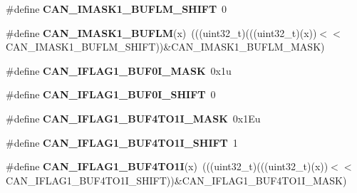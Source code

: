 \begin{DoxyCompactItemize}
\item 
\#define {\bfseries C\+A\+N\+\_\+\+I\+M\+A\+S\+K1\+\_\+\+B\+U\+F\+L\+M\+\_\+\+S\+H\+I\+FT}~0\hypertarget{group__CAN__Register__Masks_gac50c90f8a89aa464399090953c634b8a}{}\label{group__CAN__Register__Masks_gac50c90f8a89aa464399090953c634b8a}

\item 
\#define {\bfseries C\+A\+N\+\_\+\+I\+M\+A\+S\+K1\+\_\+\+B\+U\+F\+LM}(x)~(((uint32\+\_\+t)(((uint32\+\_\+t)(x))$<$$<$C\+A\+N\+\_\+\+I\+M\+A\+S\+K1\+\_\+\+B\+U\+F\+L\+M\+\_\+\+S\+H\+I\+FT))\&C\+A\+N\+\_\+\+I\+M\+A\+S\+K1\+\_\+\+B\+U\+F\+L\+M\+\_\+\+M\+A\+SK)\hypertarget{group__CAN__Register__Masks_gad88c742e823f935e71682894123617b6}{}\label{group__CAN__Register__Masks_gad88c742e823f935e71682894123617b6}

\item 
\#define {\bfseries C\+A\+N\+\_\+\+I\+F\+L\+A\+G1\+\_\+\+B\+U\+F0\+I\+\_\+\+M\+A\+SK}~0x1u\hypertarget{group__CAN__Register__Masks_ga5d36a4819a3f3bf511cea99565f3e852}{}\label{group__CAN__Register__Masks_ga5d36a4819a3f3bf511cea99565f3e852}

\item 
\#define {\bfseries C\+A\+N\+\_\+\+I\+F\+L\+A\+G1\+\_\+\+B\+U\+F0\+I\+\_\+\+S\+H\+I\+FT}~0\hypertarget{group__CAN__Register__Masks_gae705acf892fbfc2484510abc75a3ef18}{}\label{group__CAN__Register__Masks_gae705acf892fbfc2484510abc75a3ef18}

\item 
\#define {\bfseries C\+A\+N\+\_\+\+I\+F\+L\+A\+G1\+\_\+\+B\+U\+F4\+T\+O1\+I\+\_\+\+M\+A\+SK}~0x1\+Eu\hypertarget{group__CAN__Register__Masks_ga1ea95efbf4b491b30529894ea5fd1e70}{}\label{group__CAN__Register__Masks_ga1ea95efbf4b491b30529894ea5fd1e70}

\item 
\#define {\bfseries C\+A\+N\+\_\+\+I\+F\+L\+A\+G1\+\_\+\+B\+U\+F4\+T\+O1\+I\+\_\+\+S\+H\+I\+FT}~1\hypertarget{group__CAN__Register__Masks_ga51d99b1c0de884a6dda6fba3e6826284}{}\label{group__CAN__Register__Masks_ga51d99b1c0de884a6dda6fba3e6826284}

\item 
\#define {\bfseries C\+A\+N\+\_\+\+I\+F\+L\+A\+G1\+\_\+\+B\+U\+F4\+T\+O1I}(x)~(((uint32\+\_\+t)(((uint32\+\_\+t)(x))$<$$<$C\+A\+N\+\_\+\+I\+F\+L\+A\+G1\+\_\+\+B\+U\+F4\+T\+O1\+I\+\_\+\+S\+H\+I\+FT))\&C\+A\+N\+\_\+\+I\+F\+L\+A\+G1\+\_\+\+B\+U\+F4\+T\+O1\+I\+\_\+\+M\+A\+SK)\hypertarget{group__CAN__Register__Masks_ga9e9f76f73c78d9858547491a2ea951b0}{}\label{group__CAN__Register__Masks_ga9e9f76f73c78d9858547491a2ea951b0}


\end{DoxyCompactItemize}
